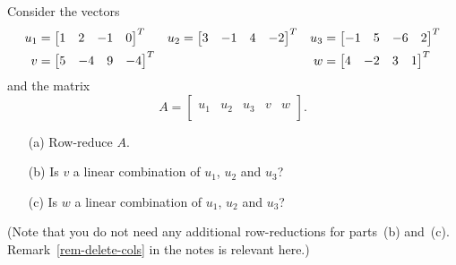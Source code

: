 \documentclass[a4paper]{amsart}
\begin{document}
\begin{exercise}\label{ex-combination-iv}
 Consider the vectors
 \begin{align*}
  u_1 &= \left[\begin{matrix} 1 &  2 & -1 & 0 \end{matrix}\right]^T &
  u_2 &= \left[\begin{matrix} 3 & -1 & 4 & -2 \end{matrix}\right]^T &
  u_3 &= \left[\begin{matrix} -1 & 5 & -6 & 2 \end{matrix}\right]^T \\
  v   &= \left[\begin{matrix} 5 & -4 & 9 & -4 \end{matrix}\right]^T &&&
  w   &= \left[\begin{matrix} 4 & -2 & 3 & 1 \end{matrix}\right]^T 
 \end{align*}
 and the matrix
 \[ A = \left[\begin{array}{c|c|c|c|c}
          &&&& \\
          u_1 & u_2 & u_3 & v & w \\
          &&&&
        \end{array}\right].
 \]
 \begin{itemize}
  \item[(a)] Row-reduce $A$.
  \item[(b)] Is $v$ a linear combination of $u_1$, $u_2$ and $u_3$?
  \item[(c)] Is $w$ a linear combination of $u_1$, $u_2$ and $u_3$?
 \end{itemize}
 (Note that you do not need any additional row-reductions for
 parts~(b) and~(c).  Remark~\ref{rem-delete-cols} in the notes is
 relevant here.)
\end{exercise}
\end{document}

